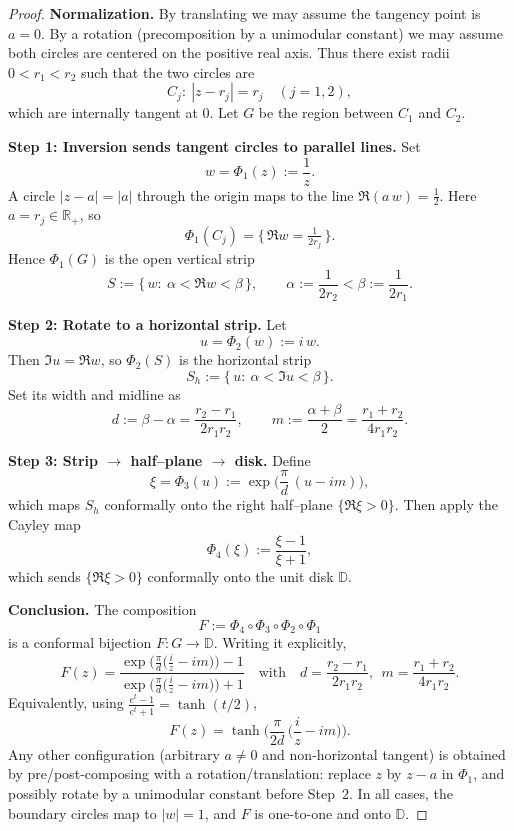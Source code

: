 \documentclass[12pt, a4paper]{report}
\theoremstyle{spaced}
\begin{document}
\begin{proof}
	\textbf{Normalization.}
	By translating we may assume the tangency point is \(a=0\). By a rotation
	(precomposition by a unimodular constant) we may assume both circles are
	centered on the positive real axis. Thus there exist radii
	\(0<r_1<r_2\) such that the two circles are
	\[
		C_j:\ |z-r_j|=r_j\quad(j=1,2),
	\]
	which are internally tangent at \(0\). Let \(G\) be the region between
	\(C_1\) and \(C_2\).

	\medskip
	\textbf{Step 1: Inversion sends tangent circles to parallel lines.}
	Set
	\[
		w=\Phi_1(z):=\frac{1}{z}.
	\]
	A circle \(|z-a|=|a|\) through the origin maps to the line
	\(\Re(a\,w)=\tfrac12\). Here \(a=r_j\in\mathbb{R}_+\), so
	\[
		\Phi_1(C_j)=\{\,\Re w=\tfrac{1}{2r_j}\,\}.
	\]
	Hence \(\Phi_1(G)\) is the open vertical strip
	\[
		S:=\Big\{\,w:\ \alpha<\Re w<\beta\,\Big\},\qquad
		\alpha:=\frac{1}{2r_2}<\beta:=\frac{1}{2r_1}.
	\]

	\medskip
	\textbf{Step 2: Rotate to a horizontal strip.}
	Let
	\[
		u=\Phi_2(w):=i\,w.
	\]
	Then \(\Im u=\Re w\), so \(\Phi_2(S)\) is the horizontal strip
	\[
		S_h:=\{\,u:\ \alpha<\Im u<\beta\,\}.
	\]
	Set its width and midline as
	\[
		d:=\beta-\alpha=\frac{r_2-r_1}{2r_1r_2},\qquad
		m:=\frac{\alpha+\beta}{2}=\frac{r_1+r_2}{4r_1r_2}.
	\]

	\medskip
	\textbf{Step 3: Strip \(\to\) half--plane \(\to\) disk.}
	Define
	\[
		\xi=\Phi_3(u):=\exp\!\Big(\frac{\pi}{d}\,(u-i m)\Big),
	\]
	which maps \(S_h\) conformally onto the right half--plane \(\{\Re \xi>0\}\).
	Then apply the Cayley map
	\[
		\Phi_4(\xi):=\frac{\xi-1}{\xi+1},
	\]
	which sends \(\{\Re \xi>0\}\) conformally onto the unit disk \(\mathbb{D}\).

	\medskip
	\textbf{Conclusion.}
	The composition
	\[
		F:=\Phi_4\circ\Phi_3\circ\Phi_2\circ\Phi_1
	\]
	is a conformal bijection \(F:G\to\mathbb{D}\). Writing it explicitly,
	\[
		F(z)=\frac{\exp\!\Big(\frac{\pi}{d}\big(\frac{i}{z}-i m\big)\Big)-1}
		{\exp\!\Big(\frac{\pi}{d}\big(\frac{i}{z}-i m\big)\Big)+1}
		\quad\text{with}\quad
		d=\frac{r_2-r_1}{2r_1r_2},\ \ m=\frac{r_1+r_2}{4r_1r_2}.
	\]
	Equivalently, using \(\frac{e^t-1}{e^t+1}=\tanh(t/2)\),
	\[
		F(z)=\tanh\!\Big(\frac{\pi}{2d}\,\Big(\frac{i}{z}-i m\Big)\Big).
	\]
	Any other configuration (arbitrary \(a\neq0\) and non‐horizontal tangent)
	is obtained by pre/post‐composing with a rotation/translation:
	replace \(z\) by \(z-a\) in \(\Phi_1\), and possibly rotate by a unimodular
	constant before Step~2. In all cases, the boundary circles map to \(|w|=1\),
	and \(F\) is one-to-one and onto \(\mathbb{D}\).
	\qedhere
\end{proof}
\newpage
\end{document}
